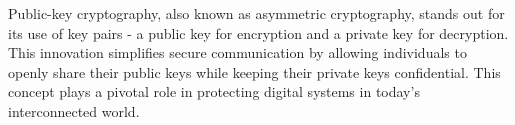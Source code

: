 Public-key cryptography, also known as asymmetric cryptography, stands out for its use of key pairs - a public key for encryption and a private key for decryption. This innovation simplifies secure communication by allowing individuals to openly share their public keys while keeping their private keys confidential. This concept plays a pivotal role in protecting digital systems in today's interconnected world.

